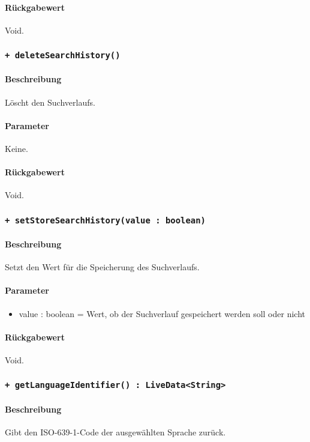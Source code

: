 \paragraph*{Rückgabewert}
Void.

\subsubsection*{\texttt{+ deleteSearchHistory()}}%
\paragraph*{Beschreibung}
Löscht den Suchverlaufs.
\paragraph*{Parameter}
Keine.
\paragraph*{Rückgabewert}
Void.

\subsubsection*{\texttt{+ setStoreSearchHistory(value : boolean)}}%
\paragraph*{Beschreibung}
Setzt den Wert für die Speicherung des Suchverlaufs.
\paragraph*{Parameter}
\begin{itemize}
    \item value : boolean = Wert, ob der Suchverlauf gespeichert werden soll oder nicht
\end{itemize}
\paragraph*{Rückgabewert}
Void.

\subsubsection*{\texttt{+ getLanguageIdentifier() : LiveData<String>}}%
\paragraph*{Beschreibung}
Gibt den ISO-639-1-Code der ausgewählten Sprache zurück.
